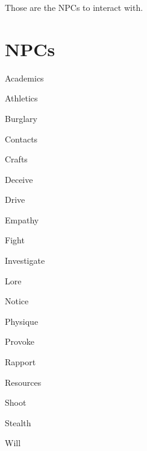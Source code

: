 Those are the NPCs to interact with.

\section{NPCs}


\begin{npcBox}[title=Leo]

    \begin{aspects}
    \item {}
    \item {}
    \item {}    
    \end{aspects}
    
    \begin{skills}
        \item {} Academics
        \item {} Athletics
        \item {} Burglary
        \item {} Contacts
        \item {} Crafts
        \item {} Deceive
        \item {} Drive
        \item {} Empathy
        \item {} Fight
        \item {} Investigate
        \item {} Lore
        \item {} Notice
        \item {} Physique
        \item {} Provoke
        \item {} Rapport
        \item {} Resources
        \item {} Shoot
        \item {} Stealth
        \item {} Will
     \end{skills}
    
    \begin{stunts}
    \item {}
    \end{stunts}

\end{npcBox}
